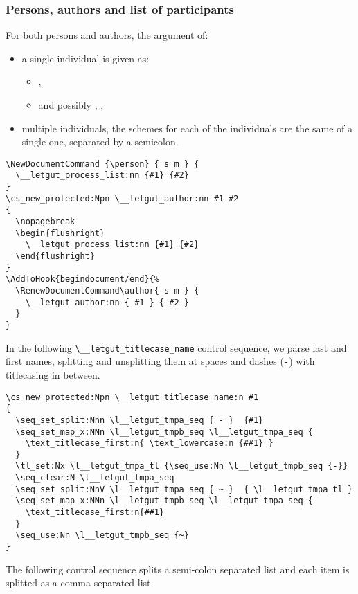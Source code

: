 \documentclass{letgut}
\begin{document}
\subsubsection{Persons, authors and list of participants}
\label{ImplementationDocumentcommandsPersonsandauthors-h5sg55h0jlj0}
For both persons and authors, the argument of:
\begin{itemize}
\item a single individual is given as:
\begin{itemize}
\item {}, 
\item and possibly , , 
\end{itemize}
\item multiple individuals, the schemes for each of the individuals are the same of
a single one, separated by a semicolon.
\end{itemize}

\begin{lstlisting}
\NewDocumentCommand {\person} { s m } {
  \__letgut_process_list:nn {#1} {#2}
}
\cs_new_protected:Npn \__letgut_author:nn #1 #2
{
  \nopagebreak
  \begin{flushright}
    \__letgut_process_list:nn {#1} {#2}
  \end{flushright}
}
\AddToHook{begindocument/end}{%
  \RenewDocumentCommand\author{ s m } {
    \__letgut_author:nn { #1 } { #2 }
  }
}
\end{lstlisting}

In the following \lstinline+\__letgut_titlecase_name+ control sequence, we parse last and
first names, splitting and unsplitting them at spaces and dashes (\lstinline+-+) with
titlecasing in between.

\begin{lstlisting}
\cs_new_protected:Npn \__letgut_titlecase_name:n #1
{
  \seq_set_split:Nnn \l__letgut_tmpa_seq { - }  {#1}
  \seq_set_map_x:NNn \l__letgut_tmpb_seq \l__letgut_tmpa_seq {
    \text_titlecase_first:n{ \text_lowercase:n {##1} }
  }
  \tl_set:Nx \l__letgut_tmpa_tl {\seq_use:Nn \l__letgut_tmpb_seq {-}}
  \seq_clear:N \l__letgut_tmpa_seq
  \seq_set_split:NnV \l__letgut_tmpa_seq { ~ }  { \l__letgut_tmpa_tl }
  \seq_set_map_x:NNn \l__letgut_tmpb_seq \l__letgut_tmpa_seq {
    \text_titlecase_first:n{##1}
  }
  \seq_use:Nn \l__letgut_tmpb_seq {~}
}
\end{lstlisting}

The following control sequence splits a semi-colon separated list and each item
is splitted as a comma separated list.
\end{document}
